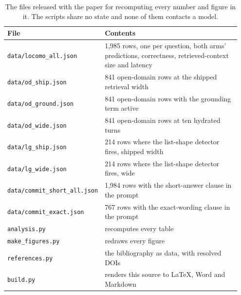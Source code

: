 \documentclass[10pt,a4paper,twocolumn]{article}
\begin{document}
\begin{table}[tb]
\centering
\caption{The files released with the paper for recomputing every number and figure in it. The scripts share no state and none of them contacts a model.}\label{table:files}
\small
\begin{tabular}{p{0.206\linewidth}p{0.744\linewidth}}
\toprule
File & Contents \\
\midrule
\texttt{data/locomo\_all.json} & 1,985 rows, one per question, both arms' predictions, correctness, retrieved-context size and latency \\
\texttt{data/od\_ship.json} & 841 open-domain rows at the shipped retrieval width \\
\texttt{data/od\_ground.json} & 841 open-domain rows with the grounding term active \\
\texttt{data/od\_wide.json} & 841 open-domain rows at ten hydrated turns \\
\texttt{data/lg\_ship.json} & 214 rows where the list-shape detector fires, shipped width \\
\texttt{data/lg\_wide.json} & 214 rows where the list-shape detector fires, wide \\
\texttt{data/commit\_short\_all.json} & 1,984 rows with the short-answer clause in the prompt \\
\texttt{data/commit\_exact.json} & 767 rows with the exact-wording clause in the prompt \\
\texttt{analysis.py} & recomputes every table \\
\texttt{make\_figures.py} & redraws every figure \\
\texttt{references.py} & the bibliography as data, with resolved DOIs \\
\texttt{build.py} & renders this source to LaTeX, Word and Markdown \\
\bottomrule
\end{tabular}
\end{table}
\end{document}
